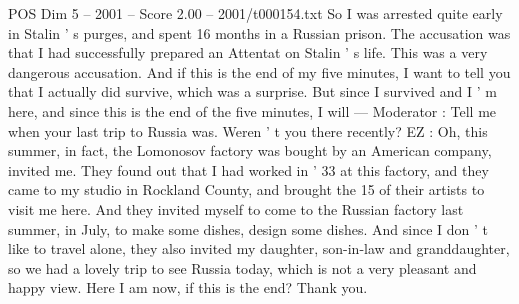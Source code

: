 \begin{textsample}{POS Dim 5 – 2001 – Score 2.00 – 2001/t000154.txt}
So I was arrested quite early in Stalin ' s purges, and spent 16 months in a Russian prison.
The accusation was that I had successfully prepared an Attentat on Stalin ' s life.
This was a very dangerous accusation.
And if this is the end of my five minutes, I want to tell you that I actually did survive, which was a surprise.
But since I survived and I ' m here, and since this is the end of the five minutes, I will — Moderator : Tell me when your last trip to Russia was.
Weren ' t you there recently?
EZ : Oh, this summer, in fact, the Lomonosov factory was bought by an American company, invited me.
They found out that I had worked in ' 33 at this factory, and they came to my studio in Rockland County, and brought the 15 of their artists to visit me here.
And they invited myself to come to the Russian factory last summer, in July, to make some dishes, design some dishes.
And since I don ' t like to travel alone, they also invited my daughter, son-in-law and granddaughter, so we had a lovely trip to see Russia today, which is not a very pleasant and happy view.
Here I am now, if this is the end?
Thank you.

\end{textsample}
